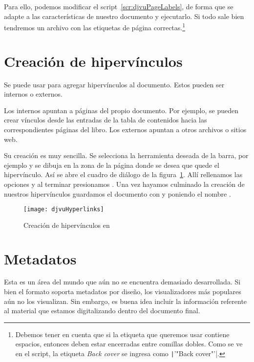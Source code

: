 \documentclass[%
	a5paper,
	10pt,
	twoside,
	openright,
	final,
]{memoir}
\begin{document}
{	Para ello, podemos modificar el script~\ref{scr:djvuPageLabels}, de forma que se adapte a las características de nuestro documento y ejecutarlo. Si todo sale bien tendremos un archivo  con las etiquetas de página correctas.\footnote{Debemos tener en cuenta que si la etiqueta que queremos usar contiene espacios, entonces deben estar encerradas entre comillas dobles. Como se ve en el script, la etiqueta \emph{Back cover} se ingresa como \texttt|'"Back cover"'|.}


	\section{Creación de hipervínculos\label{sec:djvuHyperlinks}} Se puede usar \djvueditor para agregar hipervínculos al documento. Estos pueden ser internos o externos.
	
	Los internos apuntan a páginas del propio documento. Por ejemplo, se pueden crear vínculos desde las entradas de la tabla de contenidos hacia las correspondientes páginas del libro. Los externos apuntan a otros archivos o sitios web.
	
	Su creación es muy sencilla. Se selecciona la herramienta deseada de la barra, por ejemplo  y se dibuja en la zona de la página donde se desea que quede el hipervínculo. Así se abre el cuadro de diálogo de la figura~\ref{fig:djvuHyperlinks}. Allí rellenamos las opciones y al terminar presionamos . Una vez hayamos culminado la creación de nuestros hipervínculos guardamos el documento con  y poniendo el nombre .

	\begin{figure}
		\texttt{[image: djvuHyperlinks]}
		\caption{Creación de hipervínculos en \djvueditor\label{fig:djvuHyperlinks}}
	\end{figure}

	\section{Metadatos\label{sec:djvuMetadata}} Esta es un área del mundo \djvu que aún no se encuentra demasiado desarrollada. Si bien el formato soporta metadatos por diseño, los visualizadores más populares aún no los visualizan. Sin embargo, es buena idea incluir la información referente al material que estamos digitalizando dentro del documento final.

}
\end{document}
